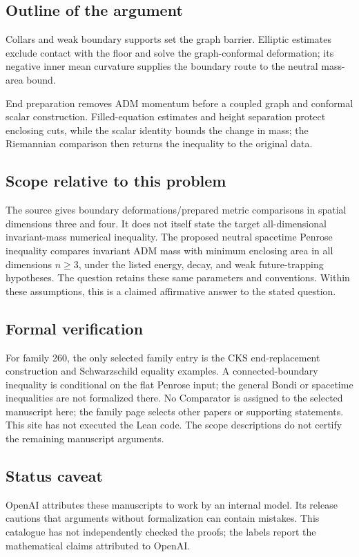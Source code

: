 \documentclass[11pt]{article}
\begin{document}
\subsection{Outline of the argument}
Collars and weak boundary supports set the graph barrier. Elliptic estimates exclude contact with the floor and solve the graph-conformal deformation; its negative inner mean curvature supplies the boundary route to the neutral mass-area bound.

End preparation removes ADM momentum before a coupled graph and conformal scalar construction. Filled-equation estimates and height separation protect enclosing cuts, while the scalar identity bounds the change in mass; the Riemannian comparison then returns the inequality to the original data.

\subsection{Scope relative to this problem}
The source gives boundary deformations/prepared metric comparisons in spatial dimensions three and four. It does not itself state the target all-dimensional invariant-mass numerical inequality. The proposed neutral spacetime Penrose inequality compares invariant ADM mass with minimum enclosing area in all dimensions $n\geq3$, under the listed energy, decay, and weak future-trapping hypotheses. The question retains these same parameters and conventions. Within these assumptions, this is a claimed affirmative answer to the stated question.

\subsection{Formal verification}
For family 260, the only selected family entry is the CKS end-replacement construction and Schwarzschild equality examples. A connected-boundary inequality is conditional on the flat Penrose input; the general Bondi or spacetime inequalities are not formalized there. No Comparator is assigned to the selected manuscript here; the family page selects other papers or supporting statements. This site has not executed the Lean code. The scope descriptions do not certify the remaining manuscript arguments.

\subsection{Status caveat}
OpenAI attributes these manuscripts to work by an internal model. Its release cautions that arguments without formalization can contain mistakes. This catalogue has not independently checked the proofs; the labels report the mathematical claims attributed to OpenAI.
\end{document}
